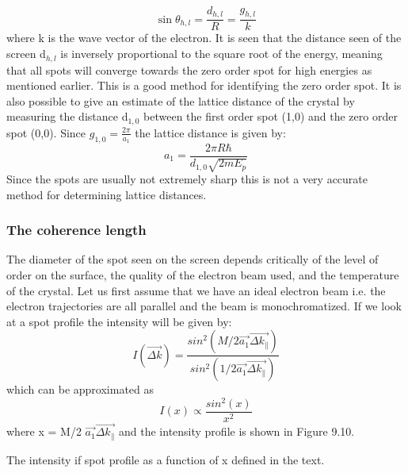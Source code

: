 \vspace{1cm}
 
\begin{equation}
\sin{\theta_{h,l}} = \frac{d_{h,l}}{R} = \frac{g_{h,l}}{k}
\end{equation}
where k is the wave vector of the electron. It is seen that the distance seen of the screen d$_{h,l}$ is inversely proportional to the  square root of the energy, meaning that all  spots will converge towards the zero order spot for high energies as mentioned earlier. This is a good method for identifying  the zero order spot. It is also  possible to give an estimate of the lattice distance of the crystal by measuring the distance d$_{1,0}$ between the first order spot (1,0) and the  zero order spot (0,0). Since $g_{1,0} = \frac{2\pi}{a_{1}}$ the lattice distance is given by:
\begin{equation}
a_{1} = \frac{2 \pi R \hbar}{d_{1,0} \sqrt{2mE_{p}}}
\end{equation}
Since the spots are usually not extremely sharp this is not a very accurate method for determining lattice distances. 


\subsubsection{The coherence length}
The diameter of the spot seen on the screen depends critically of the level of order on the surface, the quality of the electron beam used, and the temperature of the crystal. Let us first assume that we have an ideal electron beam i.e. the electron trajectories are all parallel and the beam is monochromatized. If we look at a spot profile the intensity will be given by: 
\begin{equation}
I(\overrightarrow{\Delta k}) = \frac{sin^2 (M/2 \overrightarrow{a_1} \overrightarrow{\Delta k_{\parallel}})}{sin^2 (1/2 \overrightarrow{a_1} \overrightarrow{\Delta k_{\parallel}})}
\end{equation} 
which can be approximated as
\begin{equation}
I(x) \propto \frac{sin^2 (x)}{x^2}
\end{equation}
where x = M/2 $\overrightarrow{a_1} \overrightarrow{\Delta k_{\parallel}}$
and the intensity profile is shown in Figure 9.10.
 
\vspace*{11cm}

 The intensity if spot profile as a function of x defined in the text.
 
